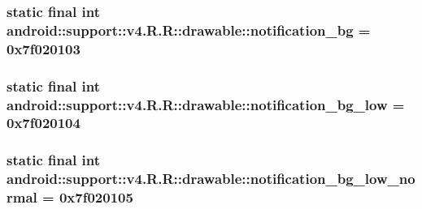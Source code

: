 \hypertarget{classandroid_1_1support_1_1v4_1_1_r_1_1drawable_941b69f536ea9235076d9ef91031bb1e}{
\subsubsection[{notification\_\-bg}]{\setlength{\rightskip}{0pt plus 5cm}static final int android::support::v4.R.R::drawable::notification\_\-bg = 0x7f020103}}
\label{classandroid_1_1support_1_1v4_1_1_r_1_1drawable_941b69f536ea9235076d9ef91031bb1e}


\hypertarget{classandroid_1_1support_1_1v4_1_1_r_1_1drawable_ebaf09373263921a670a10abde37f5e4}{
\subsubsection[{notification\_\-bg\_\-low}]{\setlength{\rightskip}{0pt plus 5cm}static final int android::support::v4.R.R::drawable::notification\_\-bg\_\-low = 0x7f020104}}
\label{classandroid_1_1support_1_1v4_1_1_r_1_1drawable_ebaf09373263921a670a10abde37f5e4}


\hypertarget{classandroid_1_1support_1_1v4_1_1_r_1_1drawable_5b159f042a4ddaa547244b2ee62f86b9}{
\subsubsection[{notification\_\-bg\_\-low\_\-normal}]{\setlength{\rightskip}{0pt plus 5cm}static final int android::support::v4.R.R::drawable::notification\_\-bg\_\-low\_\-normal = 0x7f020105}}
\label{classandroid_1_1support_1_1v4_1_1_r_1_1drawable_5b159f042a4ddaa547244b2ee62f86b9}


